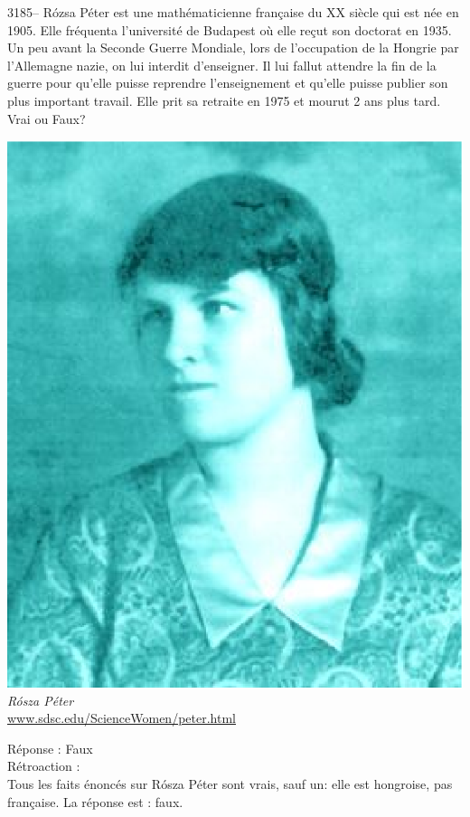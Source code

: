\documentclass[letterpaper, 12pt]{article}
\begin{document}
3185-- R\'ozsa P\'eter est une math\'ematicienne fran\c caise du {\scriptsize XX\ieme{}} si\`ecle qui est n\'ee en 1905. Elle fr\'equenta l'universit\'e de Budapest o\`u elle re\c cut son doctorat en 1935. Un peu avant la Seconde Guerre Mondiale, lors de l'occupation de la Hongrie par l'Allemagne nazie, on lui interdit d'enseigner. Il lui fallut attendre la fin de la guerre pour qu'elle puisse reprendre l'enseignement et qu'elle puisse publier son plus important travail. Elle prit sa retraite en 1975 et mourut 2 ans plus tard.\\
Vrai ou Faux?
\begin{center}
\includegraphics[scale=0.35]{peter.eps}\\
\emph{{\small R\'osza P\'eter}}\\
\href{http://www.sdsc.edu/ScienceWomen/peter.html}{www.sdsc.edu/ScienceWomen/peter.html}\\
\end{center}

R\'eponse : Faux\\

R\'etroaction :\\
Tous les faits \'enonc\'es sur R\'osza P\'eter sont vrais, sauf un: elle est hongroise, pas fran\c caise. La r\'eponse est : faux.\\
\end{document}

